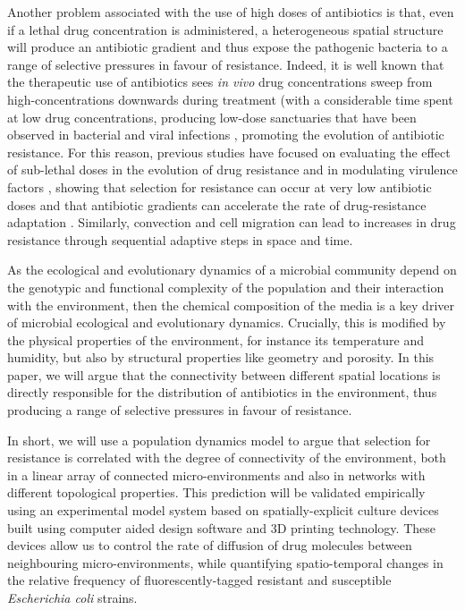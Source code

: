 \documentclass[fleqn,12pt]{wlscirep}
\begin{document}
Another problem associated with the use of high doses of antibiotics is that, even if a lethal drug concentration is administered, a heterogeneous spatial structure will produce an antibiotic gradient and thus expose the pathogenic bacteria to a range of selective pressures in favour of resistance.
Indeed, it is well known that the therapeutic use of antibiotics sees {\em in vivo} drug concentrations sweep from high-concentrations downwards during treatment (with a considerable time spent at low drug concentrations\cite{PKPD}, producing low-dose sanctuaries that have been observed in bacterial \cite{Deresinski2009} and viral infections \cite{Solas2003}, promoting the evolution of antibiotic resistance\cite{Moreno2015}. For this reason, previous studies have focused on evaluating the effect of sub-lethal doses in the evolution of drug resistance \cite{Nosanchuk2014} and in modulating virulence factors \cite{Arnoldini2014}, showing that selection for resistance can occur at very low antibiotic doses  \cite{Gullberg2011,Andersson2014} and that antibiotic gradients can accelerate the rate of drug-resistance adaptation \cite{Hermsen2012,Greulich2012,Zhang2011}. Similarly, convection \cite{Gralka2017} and cell migration \cite{Baym2016} can lead to increases in drug resistance through sequential adaptive steps in space and time. 

As the ecological and evolutionary dynamics of a microbial community depend on the genotypic and functional complexity of the population and their interaction with the environment\cite{Tecon2019}, then the chemical composition of the media is a key driver of microbial ecological and evolutionary dynamics. Crucially, this is modified by the physical properties of the environment, for instance its temperature\cite{Tenaillon2012} and humidity\cite{Zoz2016}, but also by  structural properties like geometry\cite{Lowery2018} and porosity\cite{Or2007}.  In this paper, we will argue that the connectivity between different spatial locations is directly responsible for the distribution of antibiotics in the environment, thus producing a range of selective pressures in favour of resistance.

In short, we will use a population dynamics model to argue that selection for resistance is correlated with the degree of connectivity of the environment, both in a linear array of connected micro-environments and also in networks with different topological properties. This prediction will be validated empirically using an experimental model system based on spatially-explicit culture devices built using computer aided design software and 3D printing technology. These devices allow us to control the rate of diffusion of drug molecules between neighbouring micro-environments, while quantifying spatio-temporal changes in the relative frequency of fluorescently-tagged resistant and susceptible {\em Escherichia coli} strains.
\end{document}
